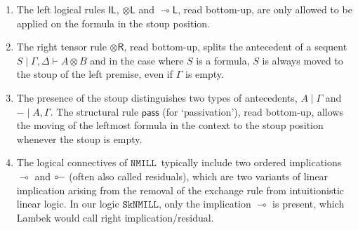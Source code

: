 \documentclass[sn-mathphys-num]{sn-jnl}%
\newcommand{\vd}{\vdash}
\newcommand{\tl}{\otimes \mathsf{L}}
\newcommand{\tr}{\otimes\mathsf{R}}
\newcommand{\pass}{\mathsf{pass}}
\newcommand{\unitl}{\mathsf{IL}}
\newcommand{\ot}{\otimes}
\newcommand{\lolli}{\multimap}
\newcommand{\lleft}{{\lolli}\mathsf{L}}
\newcommand{\illol}{\rotatebox[origin=c]{180}{$\multimap$}}
\newcommand{\unit}{\mathsf{I}}
\newcommand{\NMILL}{$\mathtt{NMILL}$}
\newcommand{\SkNMILL}{$\mathtt{SkNMILL}$}
\newcommand{\niccolo}[1]{\textcolor{red}{NV: #1}}
\theoremstyle{thmstyleone}%
\theoremstyle{thmstyletwo}%
\theoremstyle{thmstylethree}%
\begin{document}
\begin{enumerate}
\item The left logical rules $\unitl$, $\tl$ and $\lleft$, read bottom-up, are only allowed to be applied on the formula in the stoup position.
\item The right tensor rule $\tr$, read bottom-up, splits the antecedent of a sequent $S \mid \Gamma, \Delta \vd A \ot B$ and in the case where $S$ is a formula, $S$ is always moved to the stoup of the left premise, even if $\Gamma$ is empty.
\item The presence of the stoup distinguishes two types of antecedents, $A \mid \Gamma$ and ${-} \mid A, \Gamma$. The structural rule $\pass$ (for `passivation'), read bottom-up, allows the moving of the leftmost formula in the context to the stoup position whenever the stoup is empty.
\item The logical connectives of \NMILL~typically include two ordered implications $\lolli$ and $\illol$ (often also called residuals), which are two variants of linear implication arising from the removal of the exchange rule from intuitionistic linear logic. In our logic \SkNMILL, only the implication $\lolli$ is present, which Lambek would call right implication/residual.
\end{enumerate}
\end{document}
